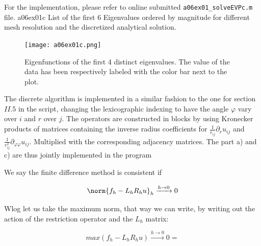 For the implementation, please refer to online submitted \texttt{a06ex01\_solveEVPc.m} file.
%
\vspace*{2\FigUpperVSpace}
		 {a06ex01c}
		 {List of the first 6 Eigenvalues ordered by magnitude for different mesh resolution and the discretized analytical solution.}
%
\begin{figure}[H]
	\centering
	\texttt{[image: a06ex01c.png]} 
	\caption{Eigenfunctions of the first 4 distinct eigenvalues.
			 The value of the data has been respectively labeled with the color bar next to the plot.}
	\label{fig:a06ex01c}
\end{figure}
%
%

%

%

%


%
The discrete algorithm is implemented in a similar fashion to the one for section $II.5$ in the script, changing the lexicographic indexing to have the angle $\varphi$ vary over $i$ and $r$ over $j$. The operators are constructed in blocks by using Kronecker products of matrices containing the inverse radius coefficients for $\frac{1}{r_{ij}}\partial_{r}u_{ij}$ and $\frac{1}{r_{ij}^2}\partial_{\varphi\varphi}u_{ij}$. Multiplied with the corresponding adjacency matrices. The part a) and c) are thus jointly implemented in the program 

%
We say the finite difference method is consistent if

\begin{equation*}
    \norm{f_h-L_h R_h u}_h \xrightarrow{ h \to 0} 0
\end{equation*}

Wlog let us take the maximum norm, that way we can write, by writing out the action of the restriction operator and the $L_h$ matrix:

\begin{equation*}
    max(f_h-L_hR_hu) \xrightarrow{ h \to 0} 0=
\end{equation*}

